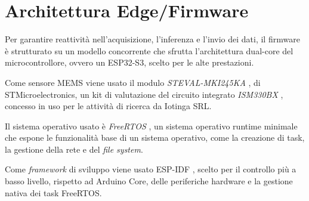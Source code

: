 \section{Architettura Edge/Firmware}
Per garantire reattività nell'acquisizione, l'inferenza e l'invio dei dati, il firmware è strutturato su un modello concorrente che sfrutta l'architettura dual-core del microcontrollore, ovvero un ESP32-S3, scelto per le alte prestazioni.

Come sensore MEMS viene usato il modulo \textit{STEVAL-MKI245KA} \cite{mems_board}, di STMicroelectronics, un kit di valutazione del circuito integrato \textit{ISM330BX} \cite{ism330bx_datasheet}, concesso in uso per le attività di ricerca da Iotinga SRL.

Il sistema operativo usato è \textit{FreeRTOS} \cite{freertos}, un sistema operativo runtime minimale che espone le funzionalità base di un sistema operativo, come la creazione di task, la gestione della rete e del \textit{file system}.

Come \textit{framework} di sviluppo viene usato ESP-IDF \cite{espressif_espidf}, scelto per il controllo più a basso livello, rispetto ad Arduino Core, delle periferiche hardware e la gestione nativa dei task FreeRTOS.










